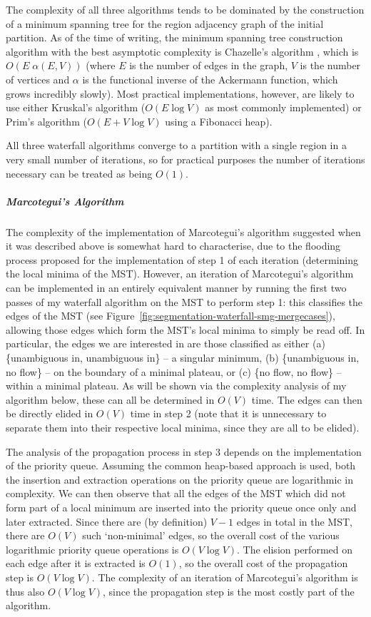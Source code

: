 The complexity of all three algorithms tends to be dominated by the construction of a minimum spanning tree for the region adjacency graph of the initial partition. As of the time of writing, the minimum spanning tree construction algorithm with the best asymptotic complexity is Chazelle's algorithm \cite{chazelle00}, which is $O(E \; \alpha(E,V))$ (where $E$ is the number of edges in the graph, $V$ is the number of vertices and $\alpha$ is the functional inverse of the Ackermann function, which grows incredibly slowly). Most practical implementations, however, are likely to use either Kruskal's algorithm ($O(E \log V)$ as most commonly implemented) or Prim's algorithm ($O(E + V \log V)$ using a Fibonacci heap).

All three waterfall algorithms converge to a partition with a single region in a very small number of iterations, so for practical purposes the number of iterations necessary can be treated as being $O(1)$.

\subparagraph{Marcotegui's Algorithm}

The complexity of the implementation of Marcotegui's algorithm suggested when it was described above is somewhat hard to characterise, due to the flooding process proposed for the implementation of step 1 of each iteration (determining the local minima of the MST). However, an iteration of Marcotegui's algorithm can be implemented in an entirely equivalent manner by running the first two passes of my waterfall algorithm on the MST to perform step 1: this classifies the edges of the MST (see Figure~\ref{fig:segmentation-waterfall-smg-mergecases}), allowing those edges which form the MST's local minima to simply be read off. In particular, the edges we are interested in are those classified as either (a) \{unambiguous in, unambiguous in\} -- a singular minimum, (b) \{unambiguous in, no flow\} -- on the boundary of a minimal plateau, or (c) \{no flow, no flow\} -- within a minimal plateau. As will be shown via the complexity analysis of my algorithm below, these can all be determined in $O(V)$ time. The edges can then be directly elided in $O(V)$ time in step 2 (note that it is unnecessary to separate them into their respective local minima, since they are all to be elided).

The analysis of the propagation process in step 3 depends on the implementation of the priority queue. Assuming the common heap-based approach \cite{clr-pq} is used, both the insertion and extraction operations on the priority queue are logarithmic in complexity. We can then observe that all the edges of the MST which did not form part of a local minimum are inserted into the priority queue once only and later extracted. Since there are (by definition) $V - 1$ edges in total in the MST, there are $O(V)$ such `non-minimal' edges, so the overall cost of the various logarithmic priority queue operations is $O(V \log V)$. The elision performed on each edge after it is extracted is $O(1)$, so the overall cost of the propagation step is $O(V \log V)$. The complexity of an iteration of Marcotegui's algorithm is thus also $O(V \log V)$, since the propagation step is the most costly part of the algorithm.


